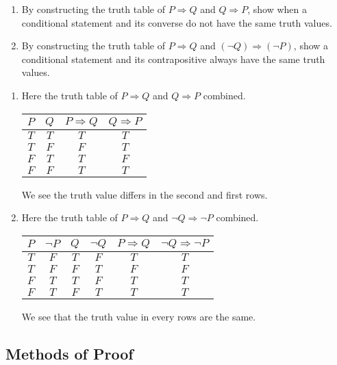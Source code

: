  \begin{problem}
 	\begin{enumerate}[label=\alph*)]
 		\item  By constructing the truth table of $P \Rightarrow Q$ and $Q \Rightarrow P$, show when a conditional statement and its converse do not have the same truth values.
 		\item By constructing the truth table of $P \Rightarrow Q$ and $(\neg Q) \Rightarrow (\neg P)$, show a conditional statement and its contrapositive always have the same truth values.
 	\end{enumerate}
 	\begin{enumerate}[label=\alph*)]
 		\item Here the truth table of $P \Rightarrow Q$ and $Q \Rightarrow P$ combined. 
 		\begin{center}
 		\begin{tabular}{c|c|c|c}
 		$P$ & $Q$ & $P \Rightarrow Q$ & $Q \Rightarrow P$ \\\hline 
 		$T$ & $T$ & $T$ & $T$ \\\hline 
 		$T$ & $F$ & $F$ & $T$  \\\hline 
 		$F$ & $T$ & $T$ & $F$ \\\hline 
 		$F$ & $F$ & $T$ & $T$ \\
 		\end{tabular}
 		\end{center}
 		We see the truth value differs in the second and first rows.
 		\item Here the truth table of $P \Rightarrow Q$ and $\neg Q \Rightarrow \neg P$ combined. 
 		\begin{center}
 		\begin{tabular}{c|c|c|c|c|c}
 		$P$ & $\neg P$ & $Q$ & $\neg Q$ & $P \Rightarrow Q$ & $\neg Q \Rightarrow \neg P$ \\\hline
 		$T$ & $F$ & $T$ & $F$ & $T$ & $T$ \\\hline 
 		$T$ & $F$ & $F$ & $T$ & $F$ & $F$  \\\hline 
 		$F$ & $T$ & $T$ & $F$ & $T$ & $T$ \\\hline 
 		$F$ & $T$ & $F$ & $T$ & $T$ & $T$ \\
 		\end{tabular}
 		\end{center}
 		We see that the truth value in every rows are the same.
 	\end{enumerate}
 \end{problem}

 \subsection[~~Methods of Proof]{Methods of Proof}

